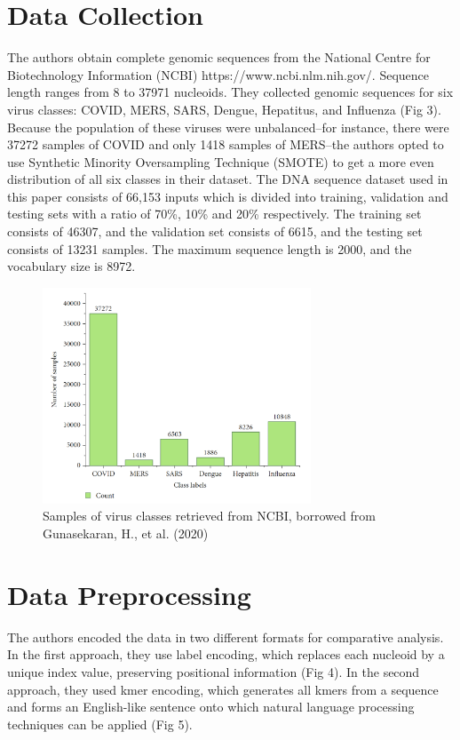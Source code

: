 \documentclass[journal]{IEEEtran}
\begin{document}
\section{Data Collection}
  The authors obtain complete genomic sequences from the 
  National Centre for Biotechnology Information (NCBI) https://www.ncbi.nlm.nih.gov/.
  Sequence length ranges from 8 to 37971 nucleoids. They collected genomic sequences
  for six virus classes: COVID, MERS, SARS, Dengue, Hepatitus, and Influenza (Fig 3).
  Because the population of these viruses were unbalanced--for instance, there were 37272
  samples of COVID and only 1418 samples of MERS--the authors opted to use
  Synthetic Minority Oversampling Technique (SMOTE) to get a more even distribution of
  all six classes in their dataset.
  The DNA sequence dataset used in this paper consists of 66,153 inputs which is divided into training, 
  validation and testing sets with a ratio of 70\%, 10\% and 20\% respectively.
  The training set consists of 46307, and the validation set consists of 6615, and the testing set consists of 13231 samples. 
  The maximum sequence length is 2000, and the vocabulary size is 8972. 

  \begin{figure}
    \centering
    \includegraphics[width=8cm]{figures/data_collection.png}
    \caption{Samples of virus classes retrieved from NCBI, borrowed from Gunasekaran, H., et al. (2020)}
  \end{figure}

\section{Data Preprocessing}
  The authors encoded the data in two different formats for comparative analysis.
  In the first approach, they use label encoding, which replaces each nucleoid by a unique index value,
  preserving positional information (Fig 4).
  In the second approach, they used kmer encoding, which generates all kmers from a sequence 
  and forms an English-like sentence onto which natural language processing techniques
  can be applied (Fig 5).
\end{document}
